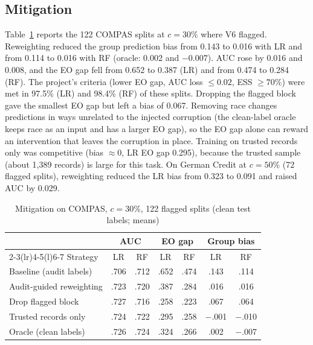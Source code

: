 \documentclass[conference]{IEEEtran}
\newcommand{\Vsix}{V6}
\begin{document}
\subsection{Mitigation}
Table~\ref{tab:mit} reports the 122 COMPAS splits at $c=30\%$ where \Vsix{} flagged. Reweighting reduced the group prediction bias from 0.143 to 0.016 with LR and from 0.114 to 0.016 with RF (oracle: 0.002 and $-0.007$). AUC rose by 0.016 and 0.008, and the EO gap fell from 0.652 to 0.387 (LR) and from 0.474 to 0.284 (RF). The project's criteria (lower EO gap, AUC loss $\le0.02$, ESS $\ge70\%$) were met in 97.5\% (LR) and 98.4\% (RF) of these splits. Dropping the flagged block gave the smallest EO gap but left a bias of 0.067. Removing race changes predictions in ways unrelated to the injected corruption (the clean-label oracle keeps race as an input and has a larger EO gap), so the EO gap alone can reward an intervention that leaves the corruption in place. Training on trusted records only was competitive (bias $\approx0$, LR EO gap 0.295), because the trusted sample (about 1,389 records) is large for this task. On German Credit at $c=50\%$ (72 flagged splits), reweighting reduced the LR bias from 0.323 to 0.091 and raised AUC by 0.029.

\begin{table}[t]
\caption{Mitigation on COMPAS, $c=30\%$, 122 flagged splits (clean test labels; means)}
\label{tab:mit}
\centering
\footnotesize
\setlength{\tabcolsep}{2.6pt}
\begin{tabular}{@{}lcccccc@{}}
\toprule
& \multicolumn{2}{c}{AUC} & \multicolumn{2}{c}{EO gap} & \multicolumn{2}{c}{Group bias}\\
\cmidrule(lr){2-3}\cmidrule(lr){4-5}\cmidrule(l){6-7}
Strategy & LR & RF & LR & RF & LR & RF\\
\midrule
Baseline (audit labels) & .706 & .712 & .652 & .474 & .143 & .114\\
Audit-guided reweighting & .723 & .720 & .387 & .284 & .016 & .016\\
Drop flagged block & .727 & .716 & .258 & .223 & .067 & .064\\
Trusted records only & .724 & .722 & .295 & .258 & $-$.001 & $-$.010\\
Oracle (clean labels) & .726 & .724 & .324 & .266 & .002 & $-$.007\\
\bottomrule
\end{tabular}
\end{table}
\end{document}
